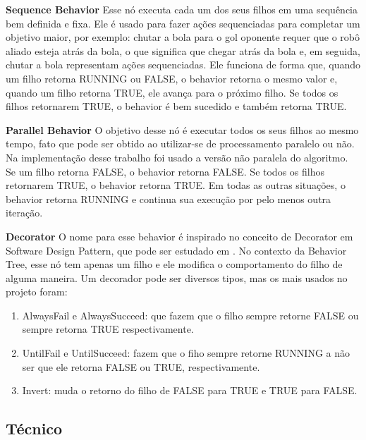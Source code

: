 \documentclass[conference]{IEEEtran}
\begin{document}
\textbf{Sequence Behavior} Esse nó executa cada um dos seus filhos em uma sequência bem definida e fixa. Ele é usado para fazer ações sequenciadas para completar um objetivo maior, por exemplo: chutar a bola para o gol oponente requer que o robô aliado esteja atrás da bola, o que significa que chegar atrás da bola e, em seguida, chutar a bola representam ações sequenciadas. Ele funciona de forma que, quando um filho retorna RUNNING ou FALSE, o behavior retorna o mesmo valor e, quando um filho retorna TRUE, ele avança para o próximo filho. Se todos os filhos retornarem TRUE, o behavior é bem sucedido e também retorna TRUE.

\textbf{Parallel Behavior} O objetivo desse nó é executar todos os seus filhos ao mesmo tempo, fato que pode ser obtido ao utilizar-se de processamento paralelo ou não. Na implementação desse trabalho foi usado a versão não paralela do algoritmo. Se um filho retorna FALSE, o behavior retorna FALSE. Se todos os filhos retornarem TRUE, o behavior retorna TRUE. Em todas as outras situações, o behavior retorna RUNNING e continua sua execução por pelo menos outra iteração.

\textbf{Decorator} O nome para esse behavior é inspirado no conceito de Decorator em Software Design Pattern, que pode ser estudado em \cite{hunt2013gang}. No contexto da Behavior Tree, esse nó tem apenas um filho e ele modifica o comportamento do filho de alguma maneira. Um decorador pode ser diversos tipos, mas os mais usados no projeto foram:

\begin{enumerate}
\item AlwaysFail e AlwaysSucceed: que fazem que o filho sempre retorne FALSE ou sempre retorna TRUE respectivamente.
\item UntilFail e UntilSucceed: fazem que o fiho sempre retorne RUNNING a não ser que ele retorna FALSE ou TRUE, respectivamente.
\item Invert: muda o retorno do filho de FALSE para TRUE e TRUE para FALSE.
\end{enumerate}

\subsection{Técnico}
\end{document}
